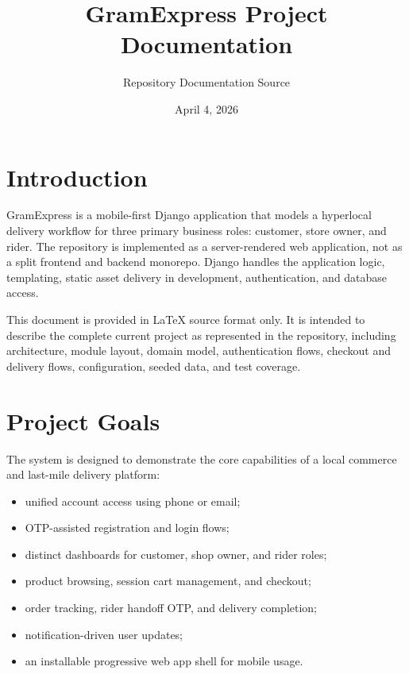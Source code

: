 \documentclass[12pt,a4paper]{article}
\title{GramExpress Project Documentation}
\author{Repository Documentation Source}
\date{April 4, 2026}
\begin{document}
\maketitle
\tableofcontents
\newpage

\section{Introduction}
GramExpress is a mobile-first Django application that models a hyperlocal delivery workflow for three primary business roles: customer, store owner, and rider. The repository is implemented as a server-rendered web application, not as a split frontend and backend monorepo. Django handles the application logic, templating, static asset delivery in development, authentication, and database access.

This document is provided in LaTeX source format only. It is intended to describe the complete current project as represented in the repository, including architecture, module layout, domain model, authentication flows, checkout and delivery flows, configuration, seeded data, and test coverage.

\section{Project Goals}
The system is designed to demonstrate the core capabilities of a local commerce and last-mile delivery platform:
\begin{itemize}[leftmargin=1.5em]
    \item unified account access using phone or email;
    \item OTP-assisted registration and login flows;
    \item distinct dashboards for customer, shop owner, and rider roles;
    \item product browsing, session cart management, and checkout;
    \item order tracking, rider handoff OTP, and delivery completion;
    \item notification-driven user updates;
    \item an installable progressive web app shell for mobile usage.
\end{itemize}
\end{document}
